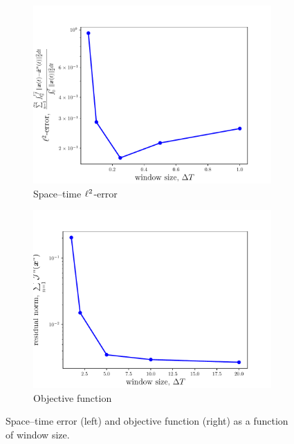 \begin{figure}
\begin{center}
\begin{subfigure}[t]{0.45\textwidth}
\includegraphics[trim={0cm 0cm 0cm 0cm},clip,width=1.\linewidth]{figs/cavity_new/error_vs_windowSize.pdf}
\caption{Space--time $\ell^2$-error}
\label{fig:cav_results2a}
\end{subfigure}
\begin{subfigure}[t]{0.45\textwidth}
\includegraphics[trim={0cm 0cm 0cm 0cm},clip,width=1.\linewidth]{figs/cavity_new/residual_vs_windowSize.pdf}
\caption{Objective function} 
\label{fig:cav_results2b}
\end{subfigure}
\end{center}
\caption{Space--time error (left) and objective function (right) as a function of window size.}
\label{fig:cav_results2}
\end{figure}

